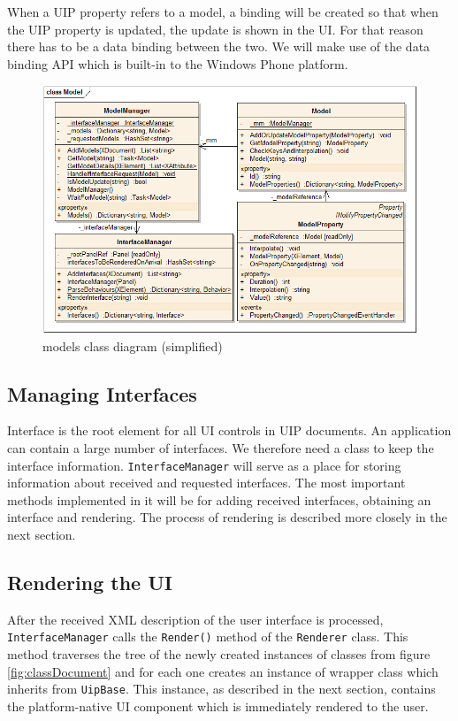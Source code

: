 When a UIP property refers to a model, a binding will be created so that when the UIP property is updated, the update is shown in the UI. For that reason there has to be a data binding between the two. We will make use of the data binding API which is built-in to the Windows Phone platform.

\begin{figure}[ht!]
\centering
\includegraphics[width=145mm]{pics/3/classModel.png}
\caption{models class diagram (simplified)}
\label{fig:classModel}
\end{figure}

\subsection{Managing Interfaces}
Interface is the root element for all UI controls in UIP documents. An application can contain a large number of interfaces. We therefore need a class to keep the interface information. \texttt{InterfaceManager} will serve as a place for storing information about received and requested interfaces. The most important methods implemented in it will be for adding received interfaces, obtaining an interface and rendering. The process of rendering is described more closely in the next section.

\subsection{Rendering the UI}
After the received XML description of the user interface is processed, \texttt{InterfaceManager} calls the \texttt{Render()} method of the \texttt{Renderer} class. This method traverses the tree of the newly created instances of classes from figure \ref{fig:classDocument} and for each one creates an instance of wrapper class which inherits from \texttt{UipBase}. This instance, as described in the next section, contains the platform-native UI component which is immediately rendered to the user.

